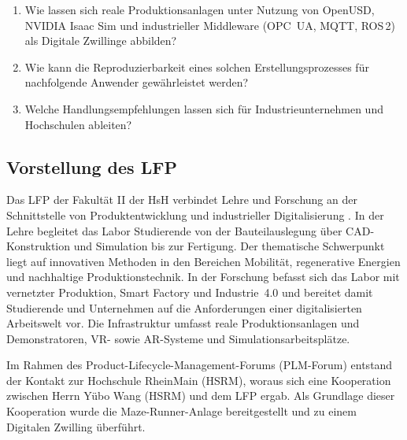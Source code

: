 \begin{enumerate}
    \item Wie lassen sich reale Produktionsanlagen unter Nutzung von OpenUSD, NVIDIA Isaac Sim und industrieller Middleware (OPC~UA, MQTT, ROS\,2) als Digitale Zwillinge abbilden?
    \item Wie kann die Reproduzierbarkeit eines solchen Erstellungsprozesses für nachfolgende Anwender gewährleistet werden?
    \item Welche Handlungsempfehlungen lassen sich für Industrieunternehmen und Hochschulen ableiten?
\end{enumerate}

\subsection{Vorstellung des LFP}
\label{subsec:lfp}
Das LFP der Fakultät II der HsH verbindet Lehre und Forschung an der Schnittstelle von Produktentwicklung und industrieller Digitalisierung \cite{lfp_hsh}. In der Lehre begleitet das Labor Studierende von der Bauteilauslegung über CAD-Konstruktion und Simulation bis zur Fertigung. Der thematische Schwerpunkt liegt auf innovativen Methoden in den Bereichen Mobilität, regenerative Energien und nachhaltige Produktionstechnik. In der Forschung befasst sich das Labor mit vernetzter Produktion, Smart Factory und Industrie~4.0 und bereitet damit Studierende und Unternehmen auf die Anforderungen einer digitalisierten Arbeitswelt vor. Die Infrastruktur umfasst reale Produktionsanlagen und Demonstratoren, VR- sowie AR-Systeme und Simulationsarbeitsplätze.

Im Rahmen des Product-Lifecycle-Management-Forums (PLM-Forum) entstand der Kontakt zur Hochschule RheinMain (HSRM), woraus sich eine Kooperation zwischen Herrn Yübo Wang (HSRM) und dem LFP ergab.
Als Grundlage dieser Kooperation wurde die Maze-Runner-Anlage bereitgestellt und zu einem Digitalen Zwilling überführt.
